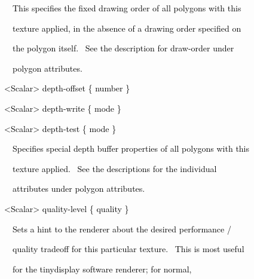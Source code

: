 \documentclass[a4paper]{article}
\newcommand\textstyleOOoComputerKeyWord[1]{\textrm{\textcolor[rgb]{0.0,0.0,0.5019608}{#1}}}
\begin{document}
\bigskip

{\color{black}
\textstyleOOoComputerKeyWord{\textcolor{black}{\ \ \ \ This specifies the fixed drawing order of all polygons with
this}}}

{\color{black}
\textstyleOOoComputerKeyWord{\textcolor{black}{\ \ \ \ texture applied, in the absence of a drawing order specified
on}}}

{\color{black}
\textstyleOOoComputerKeyWord{\textcolor{black}{\ \ \ \ the polygon itself. \ See the description for draw-order under}}}

{\color{black}
\textstyleOOoComputerKeyWord{\textcolor{black}{\ \ \ \ polygon attributes.}}}


\bigskip

{\color{black}
\textstyleOOoComputerKeyWord{\textcolor{black}{\ \ {\textless}Scalar{\textgreater} depth-offset \{ number \}}}}

{\color{black}
\textstyleOOoComputerKeyWord{\textcolor{black}{\ \ {\textless}Scalar{\textgreater} depth-write \{ mode \}}}}

{\color{black}
\textstyleOOoComputerKeyWord{\textcolor{black}{\ \ {\textless}Scalar{\textgreater} depth-test \{ mode \}}}}


\bigskip

{\color{black}
\textstyleOOoComputerKeyWord{\textcolor{black}{\ \ \ \ Specifies special depth buffer properties of all polygons with
this}}}

{\color{black}
\textstyleOOoComputerKeyWord{\textcolor{black}{\ \ \ \ texture applied. \ See the descriptions for the individual}}}

{\color{black}
\textstyleOOoComputerKeyWord{\textcolor{black}{\ \ \ \ attributes under polygon attributes.}}}


\bigskip

{\color{black}
\textstyleOOoComputerKeyWord{\textcolor{black}{\ \ {\textless}Scalar{\textgreater} quality-level \{ quality \}}}}


\bigskip

{\color{black}
\textstyleOOoComputerKeyWord{\textcolor{black}{\ \ \ \ Sets a hint to the renderer about the desired performance /}}}

{\color{black}
\textstyleOOoComputerKeyWord{\textcolor{black}{\ \ \ \ quality tradeoff for this particular texture. \ This is most
useful}}}

{\color{black}
\textstyleOOoComputerKeyWord{\textcolor{black}{\ \ \ \ for the tinydisplay software renderer; for normal,}}}
\end{document}

